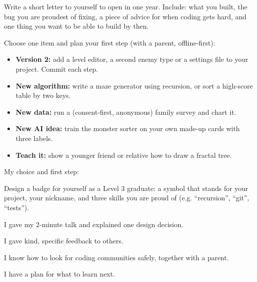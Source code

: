 \namedateline

\begin{core}
Write a short letter to yourself to open in one year. Include: what you built, the bug you are proudest of fixing, a piece of advice for when coding gets hard, and one thing you want to be able to build by then.
\end{core}

\begin{challenge}
Choose one item and plan your first step (with a parent, offline-first):
\begin{itemize}[itemsep=1pt]
  \item \textbf{Version 2:} add a level editor, a second enemy type or a settings file to your project. Commit each step.
  \item \textbf{New algorithm:} write a maze generator using recursion, or sort a high-score table by two keys.
  \item \textbf{New data:} run a (consent-first, anonymous) family survey and chart it.
  \item \textbf{New AI idea:} train the monster sorter on your own made-up cards with three labels.
  \item \textbf{Teach it:} show a younger friend or relative how to draw a fractal tree.
\end{itemize}
My choice and first step: 
\end{challenge}

\begin{creative}
Design a badge for yourself as a Level 3 graduate: a symbol that stands for your project, your nickname, and three skills you are proud of (e.g. \enquote{recursion}, \enquote{git}, \enquote{tests}).
\answerspace{4cm}
\end{creative}

\begin{selfcheck}
  \item I gave my 2-minute talk and explained one design decision.
  \item I gave kind, specific feedback to others.
  \item I know how to look for coding communities safely, together with a parent.
  \item I have a plan for what to learn next.
\end{selfcheck}
